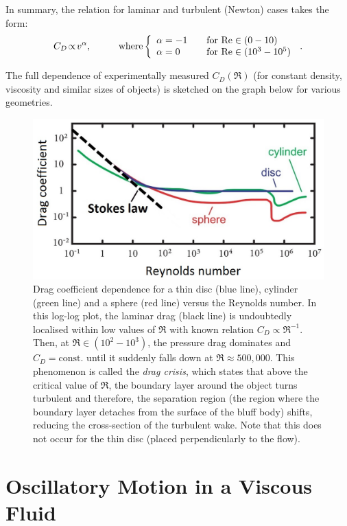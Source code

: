 In summary, the relation for laminar and turbulent (Newton) cases takes the form:
$$
C_D \!\propto\! v^\alpha, \hspace{1cm}
\text{where}
\left\{ 
  \begin{array}{l l}
    \alpha=-1 & \quad \text{for $\Re \in (0-10)$}\\
    \alpha=0 & \quad \text{for $\Re \in (10^3-10^5)$}
  \end{array}
\right.\,. 
$$

The full dependence of experimentally measured $C_D(\Re)$ (for constant density, viscosity and similar sizes of objects) is sketched on the graph below for various geometries.

\begin{figure}[h]
\centering
\includegraphics[scale=0.4]{graphics/dragcoeff}
\caption{Drag coefficient dependence for a thin disc (blue line), cylinder (green line) and a sphere (red line) versus the Reynolds number. In this log-log plot, the laminar drag (black line) is undoubtedly localised within low values of $\Re$ with known relation $C_D \!\propto\! \Re^{-1}$. Then, at $\Re \in (10^2-10^3)$, the pressure drag dominates and $C_D=\text{const.}$ until it suddenly falls down at $\Re \approx 500,000$. This phenomenon is called the \textit{drag crisis}, which states that above the critical value of $\Re$, the boundary layer around the object turns turbulent and therefore, the separation region (the region where the boundary layer detaches from the surface of the bluff body) shifts, reducing the cross-section of the turbulent wake. Note that this does not occur for the thin disc (placed perpendicularly to the flow).}
\end{figure}



\section{Oscillatory Motion in a Viscous Fluid}

